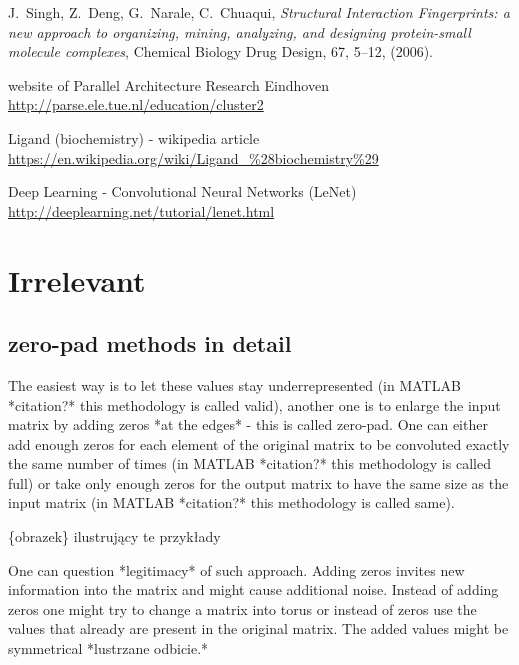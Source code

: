 \documentclass[a4paper,10pt]{report}
\begin{document}
\begin{thebibliography}{99}
      J.~Singh, Z.~Deng, G.~Narale, C.~Chuaqui,
      \textit{Structural Interaction Fingerprints: a new approach to organizing, mining, analyzing, and designing protein-small molecule complexes},
      Chemical Biology Drug Design, 67, 5--12,
      (2006).
      
      website of Parallel Architecture Research Eindhoven
      \url{http://parse.ele.tue.nl/education/cluster2}

      Ligand (biochemistry) - wikipedia article
      \url{https://en.wikipedia.org/wiki/Ligand_%28biochemistry%29}
     
      Deep Learning - Convolutional Neural Networks (LeNet)
      \url{http://deeplearning.net/tutorial/lenet.html}
      
    
  \end{thebibliography}
  

    
  \chapter{Irrelevant} %
    \section{zero-pad methods in detail}
      The easiest way is to let these values stay underrepresented (in MATLAB *citation?* this methodology is called valid), another one is to enlarge the input matrix by adding zeros *at the edges* - this is called zero-pad. One can either add enough zeros for each element of the original matrix to be convoluted exactly the same number of times (in MATLAB *citation?* this methodology is called full) or take only enough zeros for the output matrix to have the same size as the input matrix (in MATLAB *citation?* this methodology is called same). 
	  
      \{obrazek\} ilustrujący te przykłady  
	  
      One can question *legitimacy* of such approach. Adding zeros invites new information into the matrix and might cause additional noise. Instead of adding zeros one might try to change a matrix into torus or instead of zeros use the values that already are present in the original matrix. The added values might be symmetrical *lustrzane odbicie.* 
	  
\end{document}
